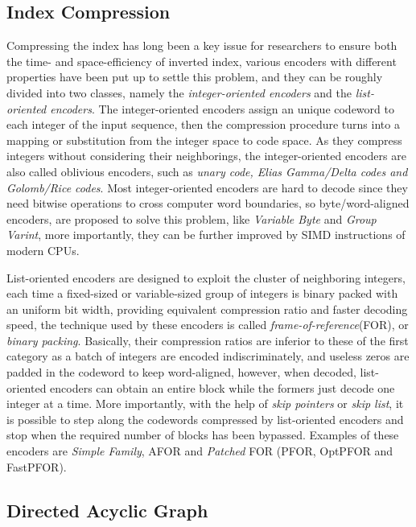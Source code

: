 \documentclass[runningheads,a4paper]{llncs}
\begin{document}
\subsection{Index Compression}

Compressing the index has long been a key issue for researchers to ensure both the time- and space-efficiency of inverted index, various encoders with different properties have been put up to settle this problem, and they can be roughly divided into two classes, namely the \textit{integer-oriented encoders} and the \textit{list-oriented encoders}. The integer-oriented encoders assign an unique codeword to each integer of the input sequence, then the compression procedure turns into a mapping or substitution from the integer space to code space. As they compress integers without considering their neighborings, the integer-oriented encoders are also called oblivious encoders\cite{catena2014inverted}, such as \textit{unary code, Elias Gamma/Delta codes \emph{and} Golomb/Rice codes}. Most integer-oriented encoders are hard to decode since they need bitwise operations to cross computer word boundaries, so byte/word-aligned encoders, are proposed to solve this problem, like \textit{Variable Byte} and \textit{Group Varint}, more importantly, they can be further improved by SIMD instructions of modern CPUs\cite{stepanov2011simd,trotman2014compression}.

List-oriented encoders are designed to exploit the cluster of neighboring integers, each time a fixed-sized or variable-sized group of integers is binary packed with an uniform bit width, providing equivalent compression ratio and faster decoding speed, the technique used by these encoders is called \textit{frame-of-reference}(FOR), or \textit{binary packing}\cite{goldstein1998compressing}. Basically, their compression ratios are inferior to these of the first category as a batch of integers are encoded indiscriminately, and useless zeros are padded in the codeword to keep word-aligned, however, when decoded, list-oriented encoders can obtain an entire block while the formers just decode one integer at a time. More importantly, with the help of \textit{skip pointers} or \textit{skip list}, it is possible to step along the codewords compressed by list-oriented encoders and stop when the required number of blocks has been bypassed. Examples of these encoders are \textit{Simple Family}, AFOR and \textit{Patched} FOR (PFOR, OptPFOR and FastPFOR).

\subsection{Directed Acyclic Graph}
\end{document}
